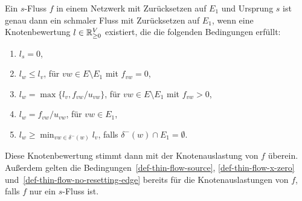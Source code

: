 \begin{lemma}\label{lemma-thin-flow-t-def}
	Ein $s$-Fluss $f$ in einem Netzwerk mit Zurücksetzen auf $E_1$ und Ursprung $s$ ist genau dann ein schmaler Fluss mit Zurücksetzen auf $E_1$, wenn eine Knotenbewertung $l\in\mathbb{R}_{\geq 0}^V$ existiert, die die folgenden Bedingungen erfüllt:
	\begin{enumerate}[label=(T\arabic*)]
		\item\label{def-thin-flow-source} $l_s = 0$,
		\item\label{def-thin-flow-x-zero} $l_w \leq l_v$, \tabto{4.5cm} für $vw\in E \setminus E_1$ mit $f_{vw}=0$,
		\item\label{def-thin-flow-x-positive} $l_w = \max\{ l_v, f_{vw} / u_{vw} \}$,  \tabto{4.5cm} für $vw\in E\setminus E_1$ mit $f_{vw} > 0$,
		\item\label{def-thin-flow-resetting-edge} $l_w = f_{vw} / u_{vw}$,  \tabto{4.5cm} für $vw\in E_1$,
		\item\label{def-thin-flow-no-resetting-edge} $l_w \geq \min_{vw\in \delta^-(w)} l_v$, \tabto{4.5cm} falls $\delta^-(w)\cap E_1 = \emptyset$.
	\end{enumerate}
	Diese Knotenbewertung stimmt dann mit der Knotenauslastung von $f$ überein.
	Außerdem gelten die Bedingungen~\ref{def-thin-flow-source}, \ref{def-thin-flow-x-zero} und~\ref{def-thin-flow-no-resetting-edge} bereits für die Knotenauslastungen von $f$, falls $f$ nur ein $s$-Fluss ist.
\end{lemma}
